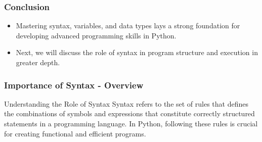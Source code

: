 \documentclass{beamer}
\begin{document}
\begin{frame}
    \frametitle{Conclusion}
    \begin{itemize}
        \item Mastering syntax, variables, and data types lays a strong foundation for developing advanced programming skills in Python.
        \item Next, we will discuss the role of syntax in program structure and execution in greater depth.
    \end{itemize}
\end{frame}

\begin{frame}[fragile]
    \frametitle{Importance of Syntax - Overview}
    \begin{block}{Understanding the Role of Syntax}
        Syntax refers to the set of rules that defines the combinations of symbols and expressions that constitute correctly structured statements in a programming language. 
        In Python, following these rules is crucial for creating functional and efficient programs.
    \end{block}
\end{frame}
\end{document}

